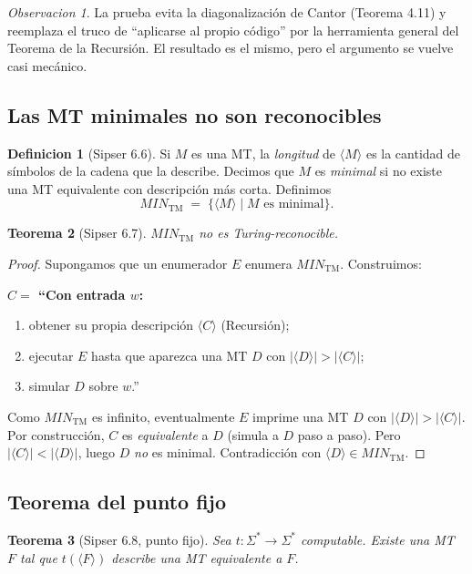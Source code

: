 \documentclass[11pt,a4paper]{article}
\theoremstyle{plain}
\newtheorem{teorema}{Teorema}[section]
\theoremstyle{definition}
\newtheorem{definicion}[teorema]{Definicion}
\theoremstyle{remark}
\newtheorem*{observacion}{Observacion}
\newcommand{\TM}{\mathrm{TM}}
\newcommand{\enc}[1]{\langle #1\rangle}
\newcommand{\Sstar}{\Sigma^{*}}
\newcommand{\MIN}{\mathit{MIN}_{\TM}}
\begin{document}
\begin{observacion}
La prueba evita la diagonalizaci\'on de Cantor (Teorema 4.11) y reemplaza el
truco de ``aplicarse al propio c\'odigo'' por la herramienta general del
Teorema de la Recursi\'on. El resultado es el mismo, pero el argumento se
vuelve casi mec\'anico.
\end{observacion}

\subsection{Las MT minimales no son reconocibles}

\begin{definicion}[Sipser 6.6]
Si $M$ es una MT, la \emph{longitud} de $\enc{M}$ es la cantidad de s\'imbolos
de la cadena que la describe. Decimos que $M$ es \emph{minimal} si no existe
una MT equivalente con descripci\'on m\'as corta. Definimos
\[
  \MIN \;=\; \{\enc{M} \mid M \text{ es minimal}\}.
\]
\end{definicion}

\begin{teorema}[Sipser 6.7]
$\MIN$ no es Turing-reconocible.
\end{teorema}

\begin{proof}
Supongamos que un enumerador $E$ enumera $\MIN$. Construimos:

\medskip\noindent\textbf{$C = $ ``Con entrada $w$:}
\begin{enumerate}
  \item obtener su propia descripci\'on $\enc{C}$ (Recursi\'on);
  \item ejecutar $E$ hasta que aparezca una MT $D$ con $|\enc{D}|>|\enc{C}|$;
  \item simular $D$ sobre $w$.''
\end{enumerate}
\medskip

Como $\MIN$ es infinito, eventualmente $E$ imprime una MT $D$ con
$|\enc{D}|>|\enc{C}|$. Por construcci\'on, $C$ es \emph{equivalente} a $D$
(simula a $D$ paso a paso). Pero $|\enc{C}|<|\enc{D}|$, luego $D$ \emph{no}
es minimal. Contradicci\'on con $\enc{D}\in\MIN$.
\end{proof}

\subsection{Teorema del punto fijo}

\begin{teorema}[Sipser 6.8, punto fijo]
\label{teo:fixedpoint}
Sea $t:\Sstar\to\Sstar$ computable. Existe una MT $F$ tal que $t(\enc{F})$
describe una MT equivalente a $F$.
\end{teorema}
\end{document}
